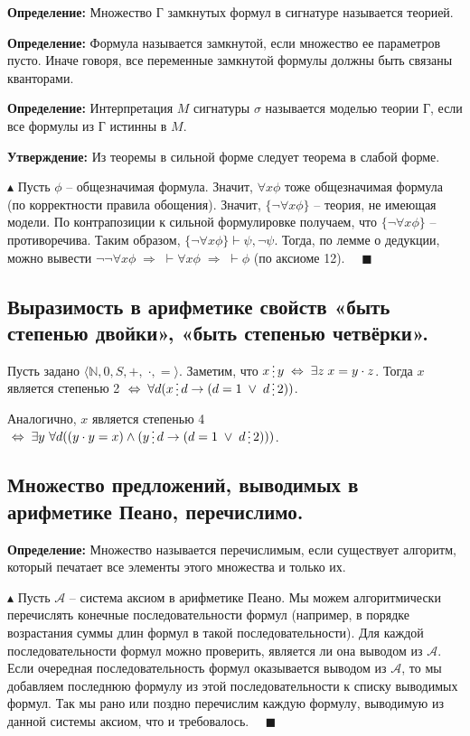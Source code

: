 \textbf{Определение:} Множество Г замкнутых формул в сигнатуре называется теорией.

\textbf{Определение:} Формула называется замкнутой, если множество ее параметров пусто. Иначе говоря, все переменные замкнутой формулы должны быть связаны кванторами.

\textbf{Определение:} Интерпретация $M$ сигнатуры $\sigma$ называется моделью теории Г, если все формулы из Г истинны в $M$.

\textbf{Утверждение:} Из теоремы в сильной форме следует теорема в слабой форме.

$\blacktriangle$ Пусть $\phi$ -- общезначимая формула. Значит, $\forall x\phi$ тоже общезначимая формула (по корректности правила обощения). Значит, $\{\neg \forall x\phi\}$ -- теория, не имеющая модели. По контрапозиции к сильной формулировке получаем, что $\{\neg \forall x\phi\}$ -- противоречива. Таким образом, $\{\neg \forall x\phi\}\vdash \psi,\neg\psi$. Тогда, по лемме о дедукции, можно вывести $\neg\neg \forall x\phi \; \Rightarrow \;\vdash\forall x \phi \; \Rightarrow \; \vdash \phi$ (по аксиоме 12). $\quad \blacksquare$

\subsection{Выразимость в арифметике свойств «быть степенью двойки», «быть степенью четвёрки».}
Пусть задано $\langle\mathbb{N}, 0, S, +, \; \cdot, =\rangle$. Заметим, что $x \svdots y \; \Leftrightarrow \; \exists z \; x= y \cdot z$. Тогда $x$ является степенью 2 $\; \Leftrightarrow \; \forall d(x \svdots d \to (d=1 \;\lor\; d \svdots 2))$.

Аналогично, $x$ является степенью 4 $\; \Leftrightarrow \; \exists y \ \forall d((y\cdot y = x) \land (y \svdots d \to (d=1 \;\lor\; d \svdots 2)))$.

\subsection{Множество предложений, выводимых в арифметике Пеано, перечислимо.}
\textbf{Определение:} Множество называется перечислимым, если существует алгоритм, который печатает все элементы этого множества и только их.

$\blacktriangle$ Пусть $\mathcal{A}$ -- система аксиом в арифметике Пеано. Мы можем алгоритмически перечислять конечные последовательности формул (например, в порядке возрастания суммы длин формул в такой последовательности). Для каждой последовательности формул можно проверить, является ли она выводом из $\mathcal{A}$. Если очередная последовательность формул оказывается выводом из $\mathcal{A}$, то мы добавляем последнюю формулу из этой последовательности к списку выводимых формул. Так мы рано или поздно перечислим каждую формулу, выводимую из данной системы аксиом, что и требовалось. $\quad \blacksquare$
